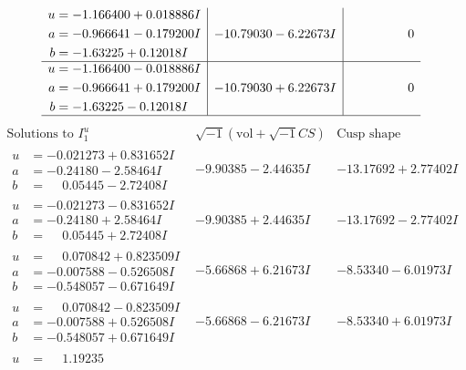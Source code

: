 \documentclass[1p]{elsarticle_modified}
\theoremstyle{definition}
\newcommand{\I}{\sqrt{-1}}
\begin{document}
$$\begin{array}{c|c|c}
\begin{aligned}
u &= -1.166400 + 0.018886 I \\
a &= -0.966641 - 0.179200 I \\
b &= -1.63225 + 0.12018 I\end{aligned}
 & -10.79030 - 6.22673 I & \phantom{-0.000000 } 0 \\ \hline\begin{aligned}
u &= -1.166400 - 0.018886 I \\
a &= -0.966641 + 0.179200 I \\
b &= -1.63225 - 0.12018 I\end{aligned}
 & -10.79030 + 6.22673 I & \phantom{-0.000000 } 0\\
 \hline 
 \end{array}$$\newpage$$\begin{array}{c|c|c}  
\text{Solutions to }I^u_{1}& \I (\text{vol} + \sqrt{-1}CS) & \text{Cusp shape}\\
 \hline 
\begin{aligned}
u &= -0.021273 + 0.831652 I \\
a &= -0.24180 - 2.58464 I \\
b &= \phantom{-}0.05445 - 2.72408 I\end{aligned}
 & -9.90385 - 2.44635 I & -13.17692 + 2.77402 I \\ \hline\begin{aligned}
u &= -0.021273 - 0.831652 I \\
a &= -0.24180 + 2.58464 I \\
b &= \phantom{-}0.05445 + 2.72408 I\end{aligned}
 & -9.90385 + 2.44635 I & -13.17692 - 2.77402 I \\ \hline\begin{aligned}
u &= \phantom{-}0.070842 + 0.823509 I \\
a &= -0.007588 - 0.526508 I \\
b &= -0.548057 - 0.671649 I\end{aligned}
 & -5.66868 + 6.21673 I & -8.53340 - 6.01973 I \\ \hline\begin{aligned}
u &= \phantom{-}0.070842 - 0.823509 I \\
a &= -0.007588 + 0.526508 I \\
b &= -0.548057 + 0.671649 I\end{aligned}
 & -5.66868 - 6.21673 I & -8.53340 + 6.01973 I \\ \hline\begin{aligned}
u &= \phantom{-}1.19235\phantom{ +0.000000I} \\

\end{aligned}
\end{array}$$
\end{document}
